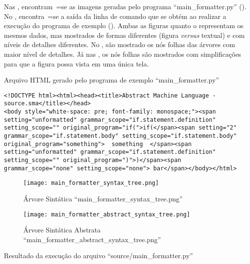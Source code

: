 Nas ,
encontram~=se as imagens geradas pelo programa ``main\_formatter.py'' ().
No ,
encontra~=se a saída da linha de comando que se obtém ao realizar a execução do programa de exemplo ().
Ambas as figuras  quanto o  representam os mesmos dados,
mas mostrados de formas diferentes (figura \textit{versus} textual) e
com níveis de detalhes diferentes.
No ,
são mostrado os nós folhas das árvores com maior nível de detalhes.
Já nas ,
os nós folhas são mostrados com simplificações para que a figura possa vista em uma única tela.
\begin{code}
\caption{Arquivo HTML gerado pelo programa de exemplo ``main\_formatter.py''}
\label{MainFormatterHtml}
\begin{verbatim}
<!DOCTYPE html><html><head><title>Abstract Machine Language - source.sma</title></head>
<body style="white-space: pre; font-family: monospace;"><span setting="unformatted" grammar_scope="if.statement.definition" setting_scope="" original_program="if(">if(</span><span setting="2" grammar_scope="if.statement.body" setting_scope="if.statement.body" original_program="something">  something  </span><span setting="unformatted" grammar_scope="if.statement.definition" setting_scope="" original_program=")">)</span><span grammar_scope="none" setting_scope="none"> bar</span></body></html>
\end{verbatim}
\end{code}

\begin{figure}[!htb]
\caption{Árvore Sintática ``main\_formatter\_syntax\_tree.png''}
\label{MainFormatterSyntaxTree}
\centering
\texttt{[image: main\_formatter\_syntax\_tree.png]}
\end{figure}

\begin{figure}[!htb]
\caption{Árvore Sintática Abstrata ``main\_formatter\_abstract\_syntax\_tree.png''}
\label{MainFormatterAbstractSyntaxTree}
\centering
\texttt{[image: main\_formatter\_abstract\_syntax\_tree.png]}
\end{figure}

\begin{code}
\caption{Resultado da execução do arquivo ``source/main\_formatter.py''}
\label{MainFormatterPyResult}
\inputminted{text}{aftertext/main_formatter_output.txt}
\end{code}


